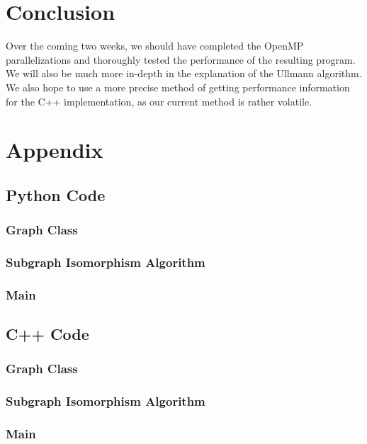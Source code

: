 \documentclass{article}
\begin{document}
\section{Conclusion}
  Over the coming two weeks, we should have completed the OpenMP parallelizations and thoroughly tested the performance of the resulting program. We will also be much more in-depth in the explanation of the Ullmann algorithm. We also hope to use a more precise method of getting performance information for the C++ implementation, as our current method is rather volatile.

\section{Appendix}
  \subsection{Python Code}
    \subsubsection{Graph Class}
      
    \subsubsection{Subgraph Isomorphism Algorithm}
      
    \subsubsection{Main}
      

  \subsection{C++ Code}
    \subsubsection{Graph Class}
      
    \subsubsection{Subgraph Isomorphism Algorithm}
      
    \subsubsection{Main}
      

  \printbibliography[heading=bibintoc,
                     title={References}]
\end{document}
